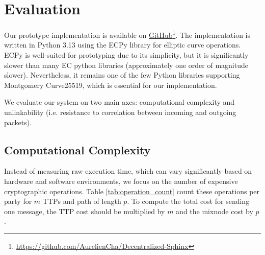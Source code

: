 \section{Evaluation}\label{sec:eval}

Our prototype implementation is available on \href{https://github.com/AurelienCha/Decentralized-Sphinx}{GitHub}\footnote{\url{https://github.com/AurelienCha/Decentralized-Sphinx}}.
The implementation is written in Python 3.13 using the ECPy library for elliptic curve operations. 
ECPy is well-suited for prototyping due to its simplicity, but it is significantly slower than many EC python libraries (approximately one order of magnitude slower). 
Nevertheless, it remains one of the few Python libraries supporting Montgomery Curve25519, which is essential for our implementation.

We evaluate our system on two main axes: computational complexity and unlinkability (i.e. resistance to correlation between incoming and outgoing packets).

\subsection{Computational Complexity}

Instead of measuring raw execution time, which can vary significantly based on hardware and software environments, we focus on the number of expensive cryptographic operations. 
Table \ref{tab:operation_count} count these operations per party for $ m $ TTPs and path of length $ p $. 
To compute the total cost for sending one message, the TTP cost should be multiplied by $ m $ and the mixnode cost by $ p $.


